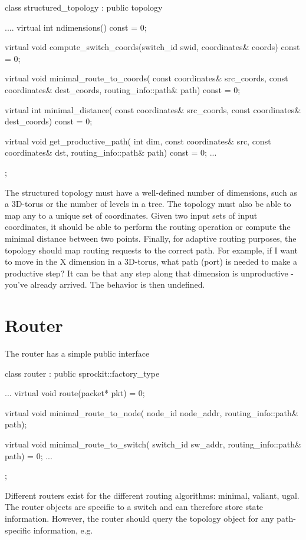 \begin{CppCode}
class structured_topology :
  public topology
{
  ....
  virtual int
  ndimensions() const = 0;	

  virtual void
  compute_switch_coords(switch_id swid, coordinates& coords) const = 0;

  virtual void
  minimal_route_to_coords(
    const coordinates& src_coords,
    const coordinates& dest_coords,
    routing_info::path& path) const = 0;

  virtual int
  minimal_distance(
    const coordinates& src_coords,
    const coordinates& dest_coords) const = 0;

  virtual void
  get_productive_path(
    int dim,
    const coordinates& src,
    const coordinates& dst,
    routing_info::path& path) const = 0;
  ...
};
\end{CppCode}
The structured topology must have a well-defined number of dimensions, such as a 3D-torus or the number of levels in a tree.
The topology must also be able to map any \switchid to a unique set of coordinates.
Given two input sets of input coordinates, it should be able to perform the routing operation or compute the minimal distance between two points.
Finally, for adaptive routing purposes, the topology should map routing requests to the correct path.
For example, if I want to move in the X dimension in a 3D-torus, what path (port) is needed to make a productive step?
It can be that any step along that dimension is unproductive - you've already arrived.
The behavior is then undefined.

\section{Router}
The router has a simple public interface

\begin{CppCode}
class router :
  public sprockit::factory_type
{
...
  virtual void
  route(packet* pkt) = 0;

  virtual void
  minimal_route_to_node(
    node_id node_addr,
    routing_info::path& path);
    
  virtual void
  minimal_route_to_switch(
    switch_id sw_addr,
    routing_info::path& path) = 0;
...
};
\end{CppCode}

Different routers exist for the different routing algorithms: 	minimal, valiant, ugal.
The router objects are specific to a switch and can therefore store state information.
However, the router should query the topology object for any path-specific information, e.g.

